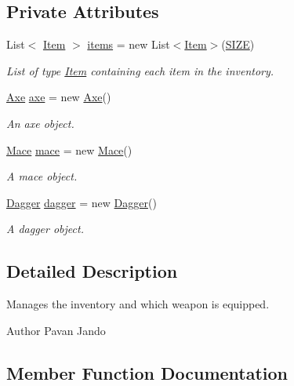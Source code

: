 \subsection*{Private Attributes}
\begin{DoxyCompactItemize}
\item 
List$<$ \mbox{\hyperlink{class_item}{Item}} $>$ \mbox{\hyperlink{class_inventory_a293c252e7e0964f7df6cce377d22f247}{items}} = new List$<$\mbox{\hyperlink{class_item}{Item}}$>$(\mbox{\hyperlink{class_inventory_aff412f987227c8b93c3165ba7dbdf9bc}{S\+I\+ZE}})
\begin{DoxyCompactList}\small\item\em List of type \mbox{\hyperlink{class_item}{Item}} containing each item in the inventory. \end{DoxyCompactList}\item 
\mbox{\hyperlink{class_axe}{Axe}} \mbox{\hyperlink{class_inventory_ac7ef00d494dbe60e3e9ea30e08cd30fe}{axe}} = new \mbox{\hyperlink{class_axe}{Axe}}()
\begin{DoxyCompactList}\small\item\em An axe object. \end{DoxyCompactList}\item 
\mbox{\hyperlink{class_mace}{Mace}} \mbox{\hyperlink{class_inventory_a3bf7a92ae58edc99043f877221812e80}{mace}} = new \mbox{\hyperlink{class_mace}{Mace}}()
\begin{DoxyCompactList}\small\item\em A mace object. \end{DoxyCompactList}\item 
\mbox{\hyperlink{class_dagger}{Dagger}} \mbox{\hyperlink{class_inventory_a1b8f3f640399e85ca055d2119817a2a2}{dagger}} = new \mbox{\hyperlink{class_dagger}{Dagger}}()
\begin{DoxyCompactList}\small\item\em A dagger object. \end{DoxyCompactList}\end{DoxyCompactItemize}


\subsection{Detailed Description}
Manages the inventory and which weapon is equipped. 

\begin{DoxyAuthor}{Author}
Pavan Jando
\end{DoxyAuthor}


\subsection{Member Function Documentation}
\mbox{\label{class_inventory_ae303988e27a0af99552f8d3c954df0c2}} 
